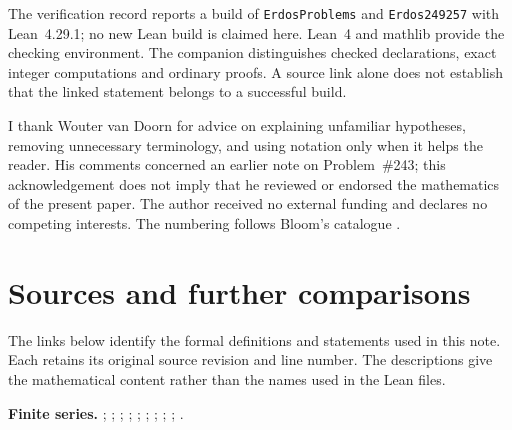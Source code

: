 \documentclass[11pt]{article}
\begin{document}
The verification record reports a build of \texttt{ErdosProblems} and
\texttt{Erdos249257} with Lean~4.29.1; no new Lean build is claimed here.
Lean~4 \cite{lean4} and mathlib \cite{mathlib} provide the checking
environment.  The companion distinguishes checked declarations, exact
integer computations and ordinary proofs.  A source link alone does not
establish that the linked statement belongs to a successful build.

I thank Wouter van Doorn for advice on explaining unfamiliar hypotheses,
removing unnecessary terminology, and using notation only when it helps
the reader.  His comments concerned an earlier note on Problem~\#243;
this acknowledgement does not imply that he reviewed or endorsed the
mathematics of the present paper.
The author received no external funding and declares no competing interests.
The numbering follows Bloom's catalogue \cite{erdosproblems}.

\section{Sources and further comparisons}
\label{sec:pinned-lean-sources}
The links below identify the formal definitions and statements used in
this note.  Each retains its original source revision and line number.
The descriptions give the mathematical content rather than the names used
in the Lean files.
\par\medskip
\begingroup
\small\raggedright
\noindent\textbf{Finite series.} ;
;
;
;
;
;
;
;
;
.\par
\end{document}
